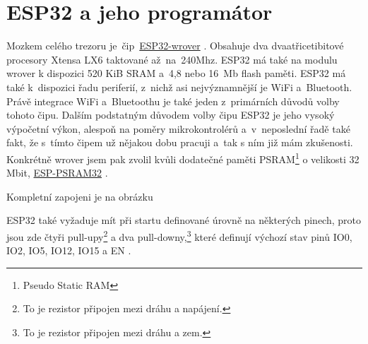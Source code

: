 \section{ESP32 a jeho programátor}


Mozkem celého trezoru je~čip~\href{https://www.espressif.com/sites/default/files/documentation/esp32-wrover-b_datasheet_en.pdf}{ESP32-wrover} \parencite{ESP32-WROVER-B}. 
Obsahuje dva dva\-a\-tři\-ce\-ti\-bi\-to\-vé procesory Xtensa LX6 taktované až~na~240Mhz. ESP32 \parencite{ESP32} má také na modulu wrover k dispozici 520 KiB SRAM 
a~4,8 nebo 16~Mb flash paměti. ESP32 má také k~dispozici řadu periferií, z~nichž asi nejvýznamnější je WiFi a~Bluetooth. Právě integrace 
WiFi a~Bluetoothu je také jeden z~primárních důvodů volby tohoto čipu. Dalším podstatným důvodem volby čipu ESP32 je jeho vysoký výpočetní výkon, 
alespoň na poměry mikrokontrolérů a~v~neposlední řadě také fakt, že s~tímto čipem už nějakou dobu pracuji a~tak s ním již mám zkušenosti. 
Konkrétně wrover jsem pak zvolil kvůli dodatečné paměti PSRAM\footnote{Pseudo Static RAM} o velikosti 32 Mbit, 
\href{http://gamma.spb.ru/images/pdf/esp-psram32_datasheet_en.pdf}{ESP-PSRAM32} \parencite{ESP-PSRAM32}.

Kompletní zapojeni je na obrázku 

ESP32 také vyžaduje mít při startu definované úrovně na některých pinech, proto jsou zde čtyři pull-upy\footnote{To je rezistor připojen mezi dráhu a napájení.} 
a dva pull-downy,\footnote{To je rezistor připojen mezi dráhu a zem.} které definují výchozí stav pinů IO0, IO2, IO5, IO12, IO15 a EN \parencite{ESP32}.
\begin{table}[h]
    \centering
    \caption{Popis funkce pinů}
    \label{tab:COMPARATION}
\end{table}


